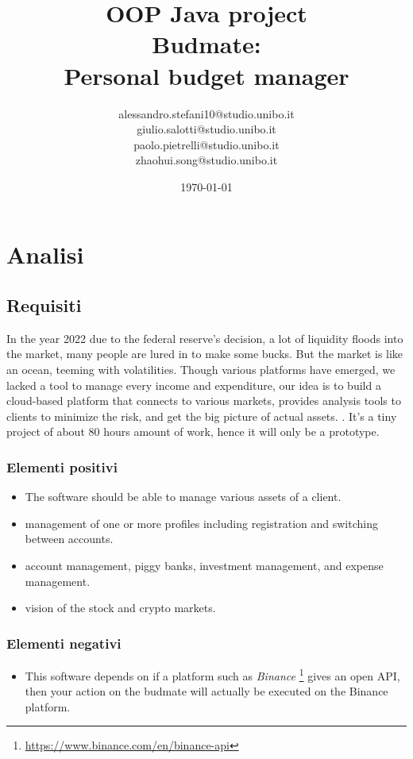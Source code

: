 \documentclass[a4paper,12pt]{report}
\title{OOP Java project \\Budmate:\\ Personal budget manager}
\author{
    alessandro.stefani10@studio.unibo.it \\
    giulio.salotti@studio.unibo.it \\
    paolo.pietrelli@studio.unibo.it \\
    zhaohui.song@studio.unibo.it
}
\date{\today}
\begin{document}
\maketitle

\tableofcontents

\chapter{Analisi}

\section{Requisiti}

In the year 2022 due to the federal reserve's decision, a lot of liquidity floods into the market, many people are lured in to make some bucks.
But the market is like an ocean, teeming with volatilities. 
Though various platforms have emerged, we lacked a tool to manage every income and expenditure, our idea is to build a cloud-based platform that connects to various markets, provides analysis tools to clients to minimize the risk, and get the big picture of actual assets. .
It's a tiny project of about 80 hours amount of work, hence it will only be a prototype.

\subsection*{Elementi positivi}
\begin{itemize}
    \item The software should be able to manage various assets of a client.
    \item management of one or more profiles including registration and switching between accounts.
    \item account management, piggy banks, investment management, and expense management.
    \item vision of the stock and crypto markets.
\end{itemize}

\subsection*{Elementi negativi}
\begin{itemize}
    \item This software depends on if a platform such as \textit{Binance} \footnote{\url{https://www.binance.com/en/binance-api}} gives an open API, then your action on the budmate will actually be executed on the Binance platform.
\end{itemize}
\end{document}
